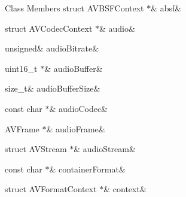 \begin{DoxyFields}{Class Members}
\mbox{\label{ffmpeg-encoder_8h_a177eb2f26b3fa873c8e95d1a2310c6ea}} 
struct AVBSFContext $\ast$&
absf&
\\
\hline

\mbox{\label{ffmpeg-encoder_8h_a7896cd7348aab763bb8f76341110ac19}} 
struct AVCodecContext $\ast$&
audio&
\\
\hline

\mbox{\label{ffmpeg-encoder_8h_a9ea53354cfc1cefd6a4e7a15615838dc}} 
unsigned&
audioBitrate&
\\
\hline

\mbox{\label{ffmpeg-encoder_8h_a145d804cb6a838ea11c71a17c461c0ac}} 
uint16\_t $\ast$&
audioBuffer&
\\
\hline

\mbox{\label{ffmpeg-encoder_8h_abdda87102fc9fdecc1cc632b4872654a}} 
size\_t&
audioBufferSize&
\\
\hline

\mbox{\label{ffmpeg-encoder_8h_a0f30301e8880ef3d36f37df956bfeb5e}} 
const char $\ast$&
audioCodec&
\\
\hline

\mbox{\label{ffmpeg-encoder_8h_a2045a8467e693ac63248c90c11934fd2}} 
AVFrame $\ast$&
audioFrame&
\\
\hline

\mbox{\label{ffmpeg-encoder_8h_a7766e73489e8ba91a733c004057dbfc3}} 
struct AVStream $\ast$&
audioStream&
\\
\hline

\mbox{\label{ffmpeg-encoder_8h_ad95a767648f0c13bf3e59f20a75f7594}} 
const char $\ast$&
containerFormat&
\\
\hline

\mbox{\label{ffmpeg-encoder_8h_a04cf92dd60b23f52a37a23ce5b2ade18}} 
struct AVFormatContext $\ast$&
context&
\\
\hline


\end{DoxyFields}

